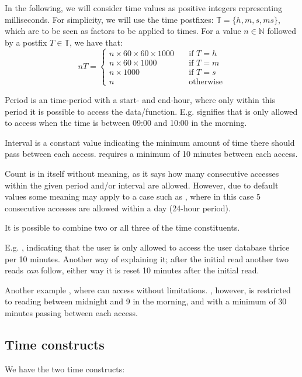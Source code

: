 In the following, we will consider time values as positive integers representing milliseconds.
For simplicity, we will use the time postfixes: $\mathbb{T} = \{ h, m, s, ms \}$, which are to be seen as factors to be applied to times.
For a value $n \in \mathbb{N}$ followed by a postfix $T \in \mathbb{T}$, we have that:
\[nT = \begin{cases}
  n \times 60 \times 60 \times 1000 & \quad\text{if } T = h \\
  n \times 60 \times 1000 & \quad\text{if } T = m \\
  n \times 1000 & \quad\text{if } T = s \\
  n & \quad\text{otherwise}
\end{cases}\]

Period is an time-period with a start- and end-hour, where only within this period it is possible to access the data/function.
E.g.  signifies that  is only allowed to access when the time is between 09:00 and 10:00 in the morning.

Interval is a constant value indicating the minimum amount of time there should pass between each access.
 requires a minimum of 10 minutes between each access.

Count is in itself without meaning, as it says how many consecutive accesses within the given period and/or interval are allowed.
However, due to default values some meaning may apply to a case such as , where in this case 5 consecutive accesses are allowed within a day (24-hour period).

It is possible to combine two or all three of the time constituents.

E.g. , indicating that the user is only allowed to access the user database thrice per 10 minutes.
Another way of explaining it; after the initial read another two reads \emph{can} follow, either way it is reset 10 minutes after the initial read.

Another example , where  can access without limitations.
, however, is restricted to reading between midnight and 9 in the morning, and with a minimum of 30 minutes passing between each access.

\subsection{Time constructs}
We have the two time constructs:

